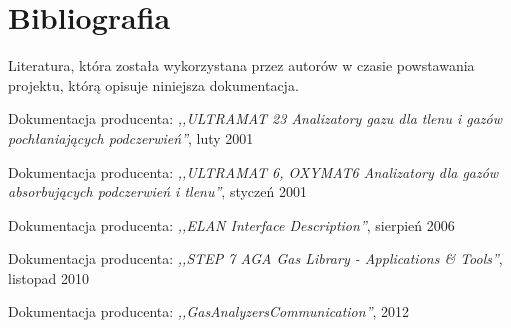 \section{Bibliografia}
Literatura, która została wykorzystana przez autorów w czasie powstawania projektu, którą opisuje niniejsza dokumentacja.

\begin{thebibliography}{9}
Dokumentacja producenta: 
\emph{,,ULTRAMAT 23 Analizatory gazu dla tlenu i gazów pochłaniających podczerwień''}, 
luty 2001

Dokumentacja producenta: 
\emph{,,ULTRAMAT 6, OXYMAT6 Analizatory dla gazów absorbujących podczerwień i tlenu''}, 
styczeń 2001

Dokumentacja producenta: 
\emph{,,ELAN Interface Description''}, 
sierpień 2006

Dokumentacja producenta: 
\emph{,,STEP 7 AGA Gas Library - Applications & Tools''}, 
listopad 2010

Dokumentacja producenta: 
\emph{,,GasAnalyzersCommunication''}, 
2012

\end{thebibliography}